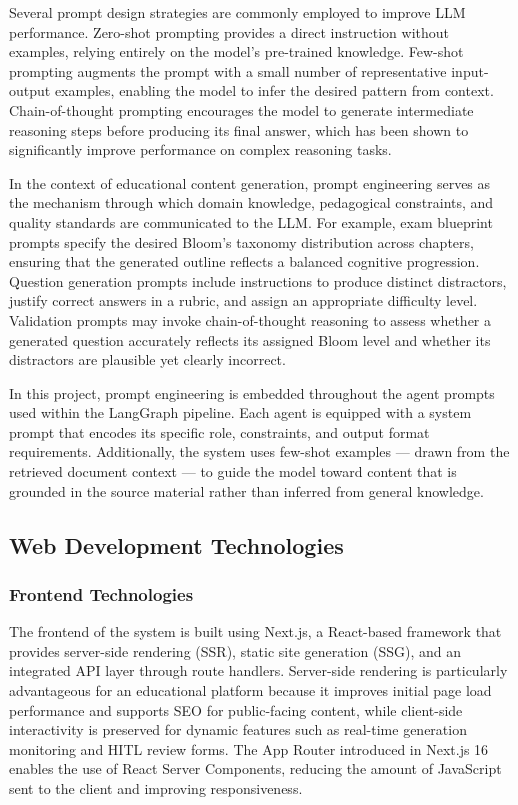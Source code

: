 \documentclass[12pt,a4paper]{article}
\begin{document}
Several prompt design strategies are commonly employed to improve LLM performance. Zero-shot prompting provides a direct instruction without examples, relying entirely on the model's pre-trained knowledge. Few-shot prompting augments the prompt with a small number of representative input-output examples, enabling the model to infer the desired pattern from context. Chain-of-thought prompting encourages the model to generate intermediate reasoning steps before producing its final answer, which has been shown to significantly improve performance on complex reasoning tasks.

In the context of educational content generation, prompt engineering serves as the mechanism through which domain knowledge, pedagogical constraints, and quality standards are communicated to the LLM. For example, exam blueprint prompts specify the desired Bloom's taxonomy distribution across chapters, ensuring that the generated outline reflects a balanced cognitive progression. Question generation prompts include instructions to produce distinct distractors, justify correct answers in a rubric, and assign an appropriate difficulty level. Validation prompts may invoke chain-of-thought reasoning to assess whether a generated question accurately reflects its assigned Bloom level and whether its distractors are plausible yet clearly incorrect.

In this project, prompt engineering is embedded throughout the agent prompts used within the LangGraph pipeline. Each agent is equipped with a system prompt that encodes its specific role, constraints, and output format requirements. Additionally, the system uses few-shot examples — drawn from the retrieved document context — to guide the model toward content that is grounded in the source material rather than inferred from general knowledge.

\subsection{Web Development Technologies}

\subsubsection{Frontend Technologies}

The frontend of the system is built using Next.js, a React-based framework that provides server-side rendering (SSR), static site generation (SSG), and an integrated API layer through route handlers. Server-side rendering is particularly advantageous for an educational platform because it improves initial page load performance and supports SEO for public-facing content, while client-side interactivity is preserved for dynamic features such as real-time generation monitoring and HITL review forms. The App Router introduced in Next.js 16 enables the use of React Server Components, reducing the amount of JavaScript sent to the client and improving responsiveness.
\end{document}
